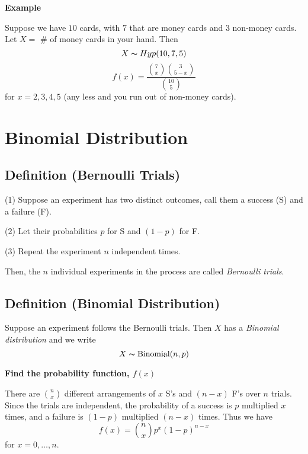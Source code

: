 \textbf{Example}

Suppose we have $ 10 $ cards, with $ 7 $ that are money cards and $ 3 $
non-money cards. Let $ X= $ \# of money cards in your hand. Then
\[ X \thicksim Hyp(10,7,5) \]
\[ f(x)=\frac{\binom{7}{x}\binom{3}{5-x}}{\binom{10}{5}} \]
for $ x=2,3,4,5 $ (any less and you run out of non-money cards).

\section{Binomial Distribution}
\begin{defbox}
    \subsection{Definition (Bernoulli Trials)}
    (1) Suppose an experiment has two distinct outcomes, call them a success (S)
    and a failure (F).

    (2) Let their probabilities $ p $ for S and $ (1-p) $ for F.

    (3) Repeat the experiment $ n $ independent times.

    Then, the $ n $ individual experiments in the process are called
    \emph{Bernoulli trials}.
\end{defbox}
\begin{defbox}
    \subsection{Definition (Binomial Distribution)}
    Suppose an experiment follows the Bernoulli trials. Then $ X $ has a
    \emph{Binomial distribution} and we write
    \[ X \thicksim \operatorname{Binomial}(n,p) \]
\end{defbox}

\textbf{Find the probability function, $ f(x)$}

There are $ \binom{n}{x} $ different arrangements of $ x $ S's and $ (n-x) $ F's
over $ n $ trials. Since the trials are independent, the probability of a success
is $ p $ multiplied $ x $ times, and a failure is $ (1-p) $ multiplied $ (n-x) $ times.
Thus we have
\[ f(x)=\binom{n}{x}p^x(1-p)^{n-x} \]
for $ x=0,\ldots ,n $.
